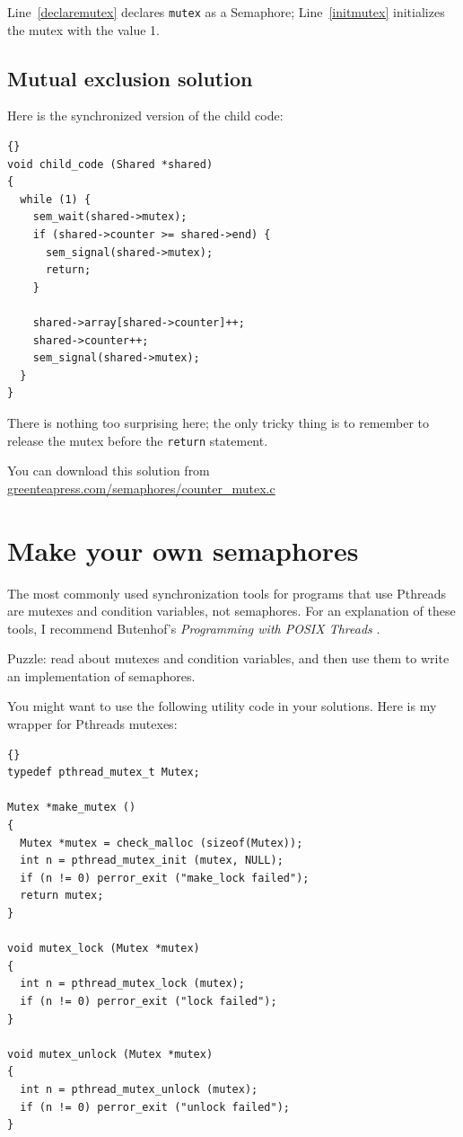 \documentclass{book}
\newcommand{\clearemptydoublepage}{\newpage\cleardoublepage}
\begin{document}
Line~\ref{declaremutex} declares {\tt mutex} as a Semaphore;
Line~\ref{initmutex} initializes the mutex with the value 1.


\clearemptydoublepage
\subsection{Mutual exclusion solution}

Here is the synchronized version of the child code:

\begin{lstlisting}[caption={}]{}
void child_code (Shared *shared)
{
  while (1) {
    sem_wait(shared->mutex);
    if (shared->counter >= shared->end) {
      sem_signal(shared->mutex);
      return;
    }

    shared->array[shared->counter]++;
    shared->counter++;
    sem_signal(shared->mutex);
  }
}
\end{lstlisting}

There is nothing too surprising here; the only tricky thing
is to remember to release the mutex before the {\tt return}
statement.

You can download this solution from 
\url{greenteapress.com/semaphores/counter_mutex.c}


\clearemptydoublepage
\section{Make your own semaphores}
\label{makeyourown}

The most commonly used synchronization tools for programs that use
Pthreads are mutexes and condition variables, not semaphores.  For an
explanation of these tools, I recommend Butenhof's {\em Programming
with POSIX Threads} \cite{butenhof}.

Puzzle: read about mutexes and condition variables, and then
use them to write an implementation of semaphores.

You might want to use the following utility code in your solutions.
Here is my wrapper for Pthreads mutexes:

\begin{lstlisting}[caption={}]{}
typedef pthread_mutex_t Mutex;

Mutex *make_mutex ()
{
  Mutex *mutex = check_malloc (sizeof(Mutex));
  int n = pthread_mutex_init (mutex, NULL);
  if (n != 0) perror_exit ("make_lock failed"); 
  return mutex;
}

void mutex_lock (Mutex *mutex)
{
  int n = pthread_mutex_lock (mutex);
  if (n != 0) perror_exit ("lock failed");
}

void mutex_unlock (Mutex *mutex)
{
  int n = pthread_mutex_unlock (mutex);
  if (n != 0) perror_exit ("unlock failed");
}
\end{lstlisting}
\end{document}
